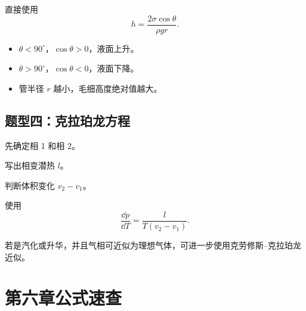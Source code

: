 \begin{MethodBox}[毛细高度计算]
直接使用
\[
  h=\frac{2\sigma\cos\theta}{\rho gr}.
\]
\begin{itemize}
  \item \(\theta<90^\circ\)，\(\cos\theta>0\)，液面上升。
  \item \(\theta>90^\circ\)，\(\cos\theta<0\)，液面下降。
  \item 管半径 \(r\) 越小，毛细高度绝对值越大。
\end{itemize}
\end{MethodBox}

\subsection{题型四：克拉珀龙方程}

\begin{MethodBox}[相平衡曲线斜率]
\begin{ReviewList}
  \item 先确定相 1 和相 2。
  \item 写出相变潜热 \(l\)。
  \item 判断体积变化 \(v_2-v_1\)。
  \item 使用
  \[
    \frac{\dd p}{\dd T}=\frac{l}{T(v_2-v_1)}.
  \]
  \item 若是汽化或升华，并且气相可近似为理想气体，可进一步使用克劳修斯--克拉珀龙近似。
\end{ReviewList}
\end{MethodBox}

\section{第六章公式速查}

